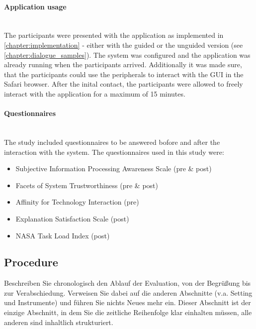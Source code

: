 \documentclass[11pt,a4paper,english]{scrreprt}
\newenvironment{comment}
  {\par\medskip
   \begingroup\color{olive}%
   }
 {\endgroup
  \medskip}
\begin{document}
\paragraph{Application usage}\mbox{} \\
The participants were presented with the application as implemented in \autoref{chapter:implementation} - either with the guided or the unguided version (see \autoref{chapter:dialogue_samples}). The system was configured and the application was already running when the participants arrived. Additionally it was made sure, that the participants could use the peripherals to interact with the GUI in the Safari browser. After the inital contact, the participants were allowed to freely interact with the application for a maximum of 15 minutes.

\paragraph{Questionnaires}\mbox{} \\
The study included questionnaires to be answered bofore and after the interaction with the system. The questionnaires used in this study were:
\begin{itemize}
    \item Subjective Information Processing Awareness Scale \parencite{schrills_sipas_2021} (pre \& post)
    \item Facets of System Trustworthiness \parencite{franke_advancing_2015} (pre \& post)
    \item Affinity for Technology Interaction \parencite{franke_personal_2019} (pre)
    \item Explanation Satisfaction Scale \parencite{hoffman_metrics_2019} (post)
    \item NASA Task Load Index \parencite{hart_nasa-task_2006} (post)
\end{itemize}

\subsection{Procedure}
\begin{comment}
Beschreiben Sie chronologisch den Ablauf der Evaluation, von der Begrüßung bis zur Verabschiedung. Verweisen Sie dabei auf die anderen Abschnitte (v.a. Setting und Instrumente) und führen Sie nichts Neues mehr ein. Dieser Abschnitt ist der einzige Abschnitt, in dem Sie die zeitliche Reihenfolge klar einhalten müssen, alle anderen sind inhaltlich strukturiert.
\end{comment}
\end{document}
